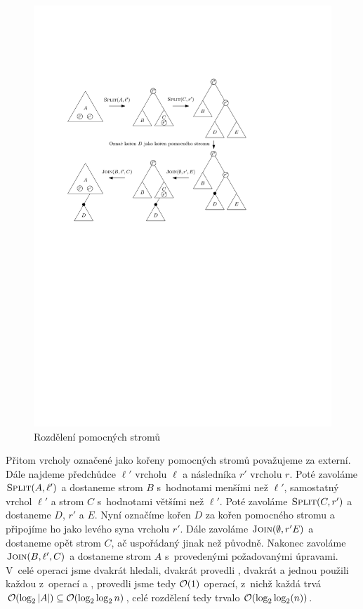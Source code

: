 \begin{figure}[h!]

  \centering
  \includegraphics[width=.9\linewidth]{../img/cut_tango}
\caption{Rozdělení pomocných stromů} 

\label{obr:cut_tango} 
 
\end{figure}


Přitom vrcholy označené jako kořeny pomocných stromů považujeme za externí.
Dále najdeme předchůdce $\ell'$ vrcholu $\ell$ a následníka $r'$ vrcholu $r$. Poté zavoláme
$\ope{Split}(A, \ell')$ a dostaneme strom $B$ s~hodnotami menšími než $\ell'$,
samostatný vrchol $\ell'$ a strom $C$ s~hodnotami většími než $\ell'$. Poté
zavoláme $\ope{Split}(C,r')$ a dostaneme $D$, $r'$ a $E$. Nyní označíme kořen
$D$ za kořen pomocného stromu a připojíme ho jako levého syna vrcholu $r'$.
Dále zavoláme $\ope{Join}(\emptyset, r' E)$ a dostaneme opět strom $C$, ač
uspořádaný jinak než původně. Nakonec zavoláme $\ope{Join}(B,\ell',C)$ a
dostaneme strom $A$ s~provedenými požadovanými úpravami. V~celé operaci jsme
dvakrát hledali, dvakrát provedli , dvakrát  a jednou
použili každou z~operací  a , provedli jsme tedy $\mathcal O(1)$ operací, z~nichž každá trvá
$\o(\log |A|)\subseteq \o(\log\log n)$, celé rozdělení tedy trvalo
$\o(\log\log(n))$.


